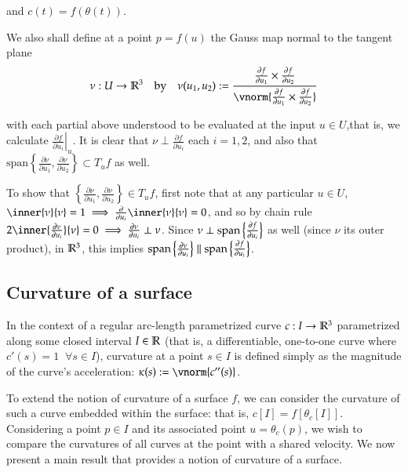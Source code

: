 	  and $c(t) = f(\theta(t))$.
	  
	  We also shall define at a point $p = f(u)$ the Gauss map normal to the tangent plane
	  \[\nu : U \to \R^3 \quad\textrm{by}\quad  \nu(u_1, u_2) :=
	  \frac{\frac{\partial f}{\partial u_1} \times \frac{\partial f}{\partial u_2}}
	  {\vnorm{\frac{\partial f}{\partial u_1} \times \frac{\partial f}{\partial u_2}}} \]
	  
	  with each partial above understood to be evaluated at the input $u \in U$,that is, we calculate $\left.\frac{\partial f}{\partial u_i}\right|_u$.
	  It is clear that $\nu \perp \frac{\partial f}{\partial u_i}$ each $i=1,2$, and also that
	  $\textrm{span}\left\{ \frac{\partial \nu}{\partial u_1}, \frac{\partial \nu}{\partial u_2}\right\} \subset T_u f$ as well.
	  
	  To show that $\left\{\frac{\partial \nu}{\partial u_1} , \frac{\partial \nu}{\partial u_2}\right\} \in T_u f$,
	  first note that at any particular $u \in U$,
	  $\inner{\nu}{\nu} = 1 \implies \frac{\partial}{\partial u_i} \inner{\nu}{\nu} = 0$,
	  and so by chain rule $2\inner{\frac{\partial \nu}{\partial u_i}}{\nu} = 0
	  \implies \frac{\partial \nu}{\partial u_i} \perp \nu $.
	  Since $ \nu \perp \mathrm{span}\left\{\frac{\partial f}{\partial u_i}\right\} $ as well (since $\nu$ its outer product), in  $\mathbb{R}^3$, this implies
	  $\mathrm{span}\left\{\frac{\partial \nu}{\partial u_i}\right\} \parallel
	  \mathrm{span}\left\{\frac{\partial f}{\partial u_i}\right\}$.
        \subsection{Curvature of a surface}
        In the context of a regular arc-length parametrized curve $c: I \to \mathbb{R}^3$ parametrized along some closed interval $I\in \mathbb{R}$
	        (that is, a differentiable, one-to-one curve where $c'(s) = 1 \;\; \forall s \in I$), curvature at a point $s \in I$ is defined simply as the magnitude of the curve's acceleration: $\kappa(s) := \vnorm{c''(s)}$.
	    
	    To extend the notion of curvature of a surface $f$, we can consider the curvature of such a curve embedded within the surface: that is, $c[I] = f[\theta_c[I]]$. Considering a point $p \in I$ and its associated point $u = \theta_c(p)$, we wish to compare the curvatures of all curves at the point with a shared velocity. We now present a main result that provides a notion of curvature of a surface.
		
